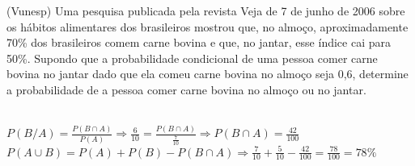 \begin{ex}
(Vunesp) Uma pesquisa publicada pela revista Veja de 7 de junho de 2006 sobre os hábitos alimentares dos brasileiros mostrou que, no almoço, aproximadamente 70\% dos brasileiros comem carne bovina e que, no jantar, esse índice cai para 50\%. Supondo que a probabilidade condicional de uma pessoa comer carne bovina no jantar dado que ela comeu carne bovina no almoço seja 0,6, determine a probabilidade de a pessoa comer carne bovina no almoço ou no jantar.
  \begin{sol}
   \phantom{A}\\
   $P(B/A)=\frac{P(B\cap A)}{P(A)}
   \Longrightarrow \frac{6}{10}=\frac{P(B \cap A)}{\frac{7}{10}}\Longrightarrow P(B \cap A)=\frac{42}{100} $\\
   $P(A \cup B)=P(A) +P(B) -P(B\cap A) \Longrightarrow \frac{7}{10}+\frac{5}{10}-\frac{42}{100}=\frac{78}{100}=78\%$
  \end{sol}
\end{ex}
